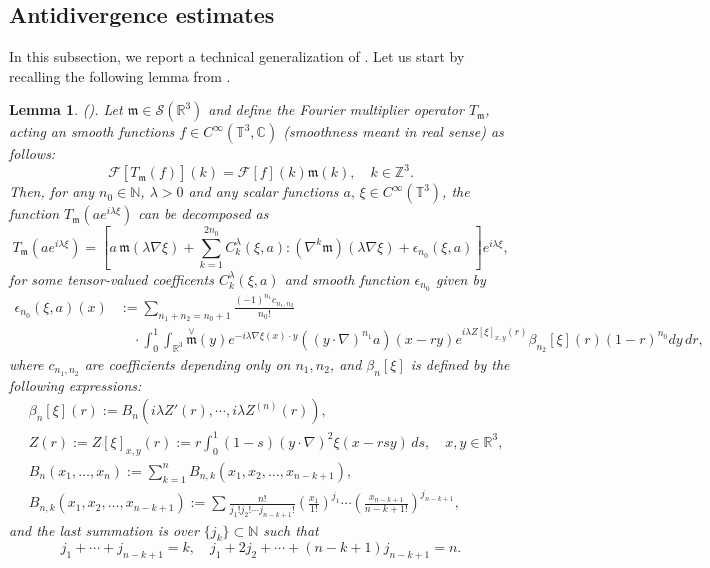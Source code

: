 \documentclass[10pt,a4paper]{amsart}
\numberwithin{equation}{section}
\numberwithin{corollario}{section}
\newtheorem{lemma}{Lemma}
\numberwithin{lemma}{section}
\numberwithin{prop}{section}
\theoremstyle{definition}
\theoremstyle{remark}
\newcommand{\N}{\mathbb{N}}
\newcommand{\Z}{\mathbb{Z}}
\newcommand{\R}{\mathbb{R}}
\newcommand{\T}{\mathbb{T}}
\begin{document}
\subsection{Antidivergence estimates}

In this subsection, we report a technical generalization of \cite[Corollary 8.2]{DLK23}. Let us start by recalling the following lemma from \cite{DLK23}.

\begin{lemma}(\cite[Lemma 8.1
]{DLK23}).  \label{lemma:antidiv}
    Let $\mathfrak{m} \in \mathcal{S}(\R^3)$ and define the Fourier multiplier operator $T_\mathfrak{m}$, acting an smooth functions $f \in C^\infty(\T^3,\mathbb{C})$ (smoothness meant in real sense) as follows:
    \begin{equation}
        \mathscr{F}
    [T_\mathfrak{m}(f)](k)=\mathscr{F}[f](k)\mathfrak{m}(k), \quad k \in \Z^3 .
    \end{equation}
Then, for any $n_0\in\N$, $\lambda>0$ and any scalar functions $a,\, \xi\in C^{\infty}(\T^3)$, the function $T_\mathfrak{m}(ae^{i\lambda \xi})$ can be decomposed as
\[T_\mathfrak{m}(ae^{i\lambda \xi})=\left[a\,\mathfrak{m}(\lambda\nabla\xi)+\sum_{k=1}^{2n_0}C_k^{\lambda}(\xi,a):(\nabla^k\mathfrak{m})(\lambda\nabla\xi)+\mathcal{\epsilon}_{n_0}(\xi,a)\right]e^{i\lambda\xi},\]
for some tensor-valued coefficents $C_k^{\lambda}(\xi,a)$ and smooth function $\mathcal{\epsilon}_{n_0}$ given by
    \begin{align}\label{e:epsn0}
        \mathcal{\epsilon}_{n_0}(\xi,a)(x)
        &:=
        \sum_{n_1+n_2=n_0+1}\frac{(-1)^{n_1}c_{n_1,n_2}}{n_0!}\\
        &\quad
        \cdot\int_0^1\int_{\R^3}\overset{\vee}{\mathfrak{m}}(y)e^{-i\lambda \nabla\xi(x)\cdot y}((y\cdot \nabla)^{n_1}a)(x-ry)e^{i\lambda Z[\xi]_{x,y}(r)}\beta_{n_2}[\xi](r)(1-r)^{n_0}dy\,dr,
    \end{align}
where $c_{n_1,n_2}$ are coefficients depending only on $n_1,n_2$, and $\beta_n[\xi]$ is  defined by the following expressions:
\begin{align}
    &\label{e:betan} \beta_n[\xi](r):=B_n(i\lambda Z'(r),\cdots,i\lambda Z^{(n)}(r)),\\
    &\label{e:Z}Z(r):=Z[\xi]_{x,y}(r):=r\int_0^1(1-s)(y\cdot\nabla)^2\xi(x-rsy)\,ds, \quad x ,y  \in \R^3 ,\\
    &\label{e:Bn}B_n(x_1,\dots,x_n):=\sum_{k=1}^nB_{n,k}(x_1,x_2,\dots,x_{n-k+1}),\\
    &\label{e:Bnk}B_{n,k}(x_1,x_2,\dots,x_{n-k+1}):=\sum \frac{n!}{j_1!j_2!\cdots j_{n-k+1}!}\left(\frac{x_1}{1!}\right)^{j_1}\cdots\left(\frac{x_{n-k+1}}{n-k+1!}\right)^{j_{n-k+1}},
\end{align}
and the last summation is over $\{j_k\}\subset \N$ such that
\[j_1+\cdots+j_{n-k+1}=k,\quad j_1+2j_2+\cdots+(n-k+1)j_{n-k+1}=n.\]
\end{lemma}
\end{document}
